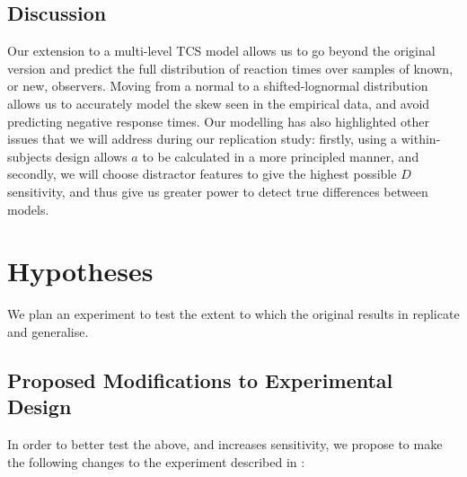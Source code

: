 \documentclass[smallextended, natbib]{svjour3}       %
\begin{document}
\subsection{Discussion}

Our extension to a multi-level TCS model allows us to go beyond the original version and predict the full distribution of reaction times over samples of known, or new, observers. Moving from a normal to a shifted-lognormal distribution allows us to accurately model the skew seen in the empirical data, and avoid predicting negative response times. Our modelling has also highlighted other issues that we will address during our replication study: firstly, using a within-subjects design allows $a$ to be calculated in a more principled manner, and secondly, we will choose distractor features to give the highest possible $D$ sensitivity, and thus give us greater power to detect true differences between models.

\section{Hypotheses}

We plan an experiment to test the extent to which the original results in \cite{buetti2019predicting} replicate and generalise.

\subsection{Proposed Modifications to Experimental Design}

In order to better test the above, and increases sensitivity, we propose to make the following changes to the experiment described in \cite{buetti2019predicting}:
\end{document}

